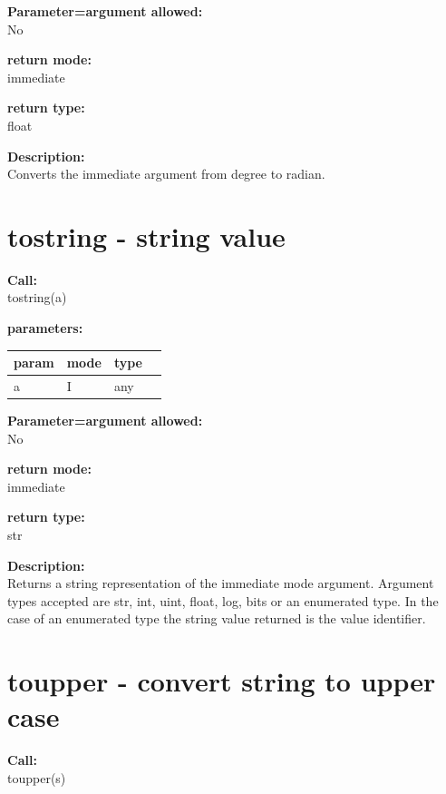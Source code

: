         {\bf Parameter=argument allowed:} \\
        No
        
        {\bf return mode:} \\
        immediate

        {\bf return type:} \\
        float
        
        {\bf Description:} \\
        Converts the immediate argument from degree to radian.
  

    \section{tostring - string value}\label{sec:iftostring}
        
        {\bf Call:} \\
        tostring(a)
        
        {\bf parameters:} \\
        \begin{tabular}{| l | l | l | l |}
        \hline
        param  & mode & type & \\
        \hline \hline
        a & I & any &  \\ \hline
        \end{tabular}
        
        {\bf Parameter=argument allowed:} \\
        No
        
        {\bf return mode:} \\
        immediate

        {\bf return type:} \\
        str
        
        {\bf Description:} \\
        Returns a string representation of the immediate mode argument.
        Argument types accepted are str, int, uint, float, log, bits or an
        enumerated type. In the case of an enumerated type the string value
        returned is the value identifier.


    \section{toupper - convert string to upper case}\label{sec:iftoupper}
        
        {\bf Call:} \\
        toupper(s)
        
